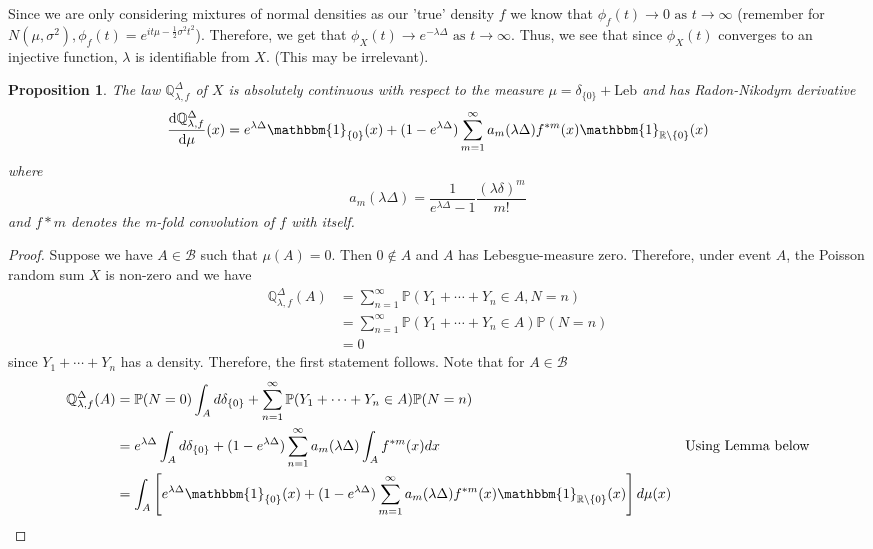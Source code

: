 \documentclass[a4paper,11pt]{article}
\theoremstyle{theorem}
\newtheorem{prop}{Proposition}[section]
\theoremstyle{definition}
\begin{document}
Since we are only considering mixtures of normal densities as our 'true' density $f$ we know that $\phi_{f}(t) \to 0 \text{ as } t \to \infty$ (remember for $N(\mu, \sigma^2), \phi_{f}(t) = e^{it\mu - \frac{1}{2}\sigma^2 t^2}$). Therefore, we get that $\phi_{X}(t) \to e^{-\lambda \Delta} \text{ as } t \to \infty$. Thus, we see that since $\phi_{X}(t)$ converges to an injective function, $\lambda$ is identifiable from $X$. (This may be irrelevant).

\begin{prop}
The law $\mathbb{Q}_{\lambda, f}^{\Delta}$ of $X$ is absolutely continuous with respect to the measure $\mu = \delta_{\{0\}} + \mathrm{Leb}$ and has Radon-Nikodym derivative
\begin{equation} \label{Radon-Nikodym}
\frac{\mathrm{d}\mathbb{Q}_{\lambda, f}^{\Delta}}{\mathrm{d}\mu}(x) = e^{\lambda \Delta} \mathbbm{1}_{\{0\}}(x) + (1 - e^{\lambda \Delta})\sum_{m=1}^{\infty}{a_m(\lambda \Delta) f^{\ast m}(x)\mathbbm{1}_{\mathbb{R}\setminus \{0\}}(x)}
\end{equation}
where
\begin{equation}
a_m(\lambda \Delta) = \frac{1}{e^{\lambda \Delta} - 1}\frac{(\lambda \delta)^m}{m!}
\end{equation}
and $f*m$ denotes the m-fold convolution of $f$ with itself.
\end{prop}

\begin{proof}
Suppose we have $A \in \mathcal{B}$ such that $\mu(A) = 0$. Then $0 \notin A$ and $A$ has Lebesgue-measure zero. Therefore, under event $A$, the Poisson random sum $X$ is non-zero and we have 
\begin{align*}
\mathbb{Q}_{\lambda, f}^{\Delta}(A) &= \sum_{n=1}^{\infty}{\mathbb{P}(Y_1 + \dotsb + Y_n  \in A, N = n)} \\
&= \sum_{n=1}^{\infty}{\mathbb{P}(Y_1 + \dotsb + Y_n  \in A)\mathbb{P}(N = n)} \\
&= 0
\end{align*}
since $Y_1 + \dotsb + Y_n$ has a density. Therefore, the first statement follows. Note that for $A \in \mathcal{B}$
\begin{align*}
\mathbb{Q}_{\lambda, f}^{\Delta}(A) &= \mathbb{P}(N = 0)\int_{A}{d\delta_{\{0\}}} + \sum_{n=1}^{\infty}{\mathbb{P}(Y_1 + \dotsb + Y_n  \in A)\mathbb{P}(N = n)} \\
&= e^{\lambda \Delta}\int_{A}{d\delta_{\{0\}}} + (1 - e^{\lambda \Delta})\sum_{n=1}^{\infty}{a_m(\lambda \Delta)\int_{A}{f^{\ast m}(x)dx}} & \text{Using Lemma below} \\
&= \int_{A}\left[{e^{\lambda \Delta} \mathbbm{1}_{\{0\}}(x) + (1 - e^{\lambda \Delta})\sum_{m=1}^{\infty}{a_m(\lambda \Delta) f^{\ast m}(x)\mathbbm{1}_{\mathbb{R}\setminus \{0\}}(x)}}\right]d\mu(x)
\end{align*}
\end{proof}
\end{document}
